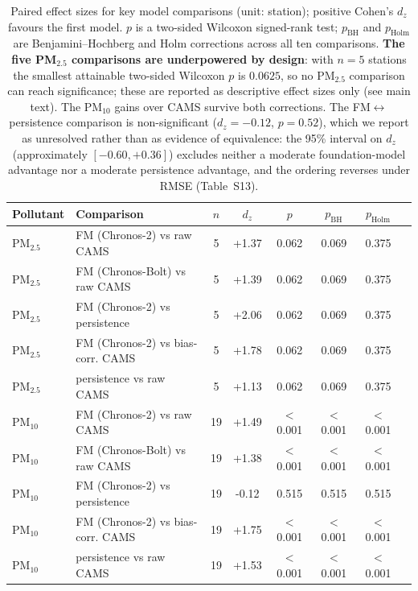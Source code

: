 \documentclass[11pt]{article}
\begin{document}
\begin{table}[htbp]\centering\footnotesize
\caption{Paired effect sizes for key model comparisons (unit: station); positive Cohen's $d_z$ favours the first model. $p$ is a two-sided Wilcoxon signed-rank test; $p_{\mathrm{BH}}$ and $p_{\mathrm{Holm}}$ are Benjamini--Hochberg and Holm corrections across all ten comparisons. \textbf{The five PM$_{2.5}$ comparisons are underpowered by design}: with $n=5$ stations the smallest attainable two-sided Wilcoxon $p$ is $0.0625$, so no PM$_{2.5}$ comparison can reach significance; these are reported as descriptive effect sizes only (see main text). The PM$_{10}$ gains over CAMS survive both corrections. The FM$\leftrightarrow$persistence comparison is non-significant ($d_z=-0.12$, $p=0.52$), which we report as unresolved rather than as evidence of equivalence: the 95\% interval on $d_z$ (approximately $[-0.60,+0.36]$) excludes neither a moderate foundation-model advantage nor a moderate persistence advantage, and the ordering reverses under RMSE (Table~S13).}
\begin{tabular}{llcccccc}\toprule
Pollutant & Comparison & $n$ & $d_z$ & $p$ & $p_{\mathrm{BH}}$ & $p_{\mathrm{Holm}}$ \\ \midrule
PM$_{2.5}$ & FM (Chronos-2) vs raw CAMS & 5 & +1.37 & 0.062 & 0.069 & 0.375 \\
PM$_{2.5}$ & FM (Chronos-Bolt) vs raw CAMS & 5 & +1.39 & 0.062 & 0.069 & 0.375 \\
PM$_{2.5}$ & FM (Chronos-2) vs persistence & 5 & +2.06 & 0.062 & 0.069 & 0.375 \\
PM$_{2.5}$ & FM (Chronos-2) vs bias-corr. CAMS & 5 & +1.78 & 0.062 & 0.069 & 0.375 \\
PM$_{2.5}$ & persistence vs raw CAMS & 5 & +1.13 & 0.062 & 0.069 & 0.375 \\
PM$_{10}$ & FM (Chronos-2) vs raw CAMS & 19 & +1.49 & $<$0.001 & $<$0.001 & $<$0.001 \\
PM$_{10}$ & FM (Chronos-Bolt) vs raw CAMS & 19 & +1.38 & $<$0.001 & $<$0.001 & $<$0.001 \\
PM$_{10}$ & FM (Chronos-2) vs persistence & 19 & -0.12 & 0.515 & 0.515 & 0.515 \\
PM$_{10}$ & FM (Chronos-2) vs bias-corr. CAMS & 19 & +1.75 & $<$0.001 & $<$0.001 & $<$0.001 \\
PM$_{10}$ & persistence vs raw CAMS & 19 & +1.53 & $<$0.001 & $<$0.001 & $<$0.001 \\
\bottomrule\end{tabular}\end{table}
\end{document}
